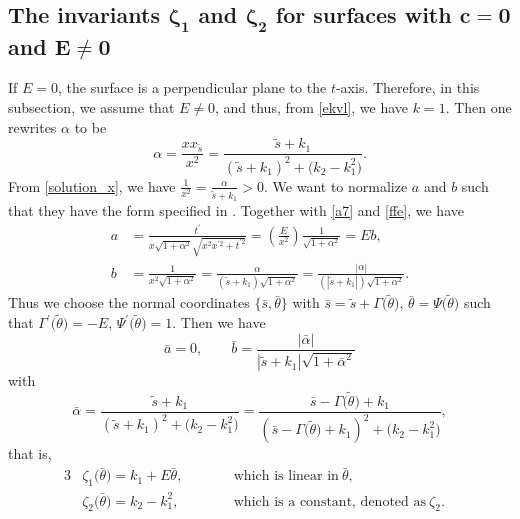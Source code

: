 \documentclass[10pt,a4paper]{amsart}
\numberwithin{equation}{section}
\begin{document}
\subsection[The invariants zeta\_1 and zeta\_2 for surfaces with c=0 and E neq 0]{The invariants $\boldsymbol{\zeta_{1}}$ and $\boldsymbol{\zeta_{2}}$ for surfaces with $\boldsymbol{c=0}$ and $\boldsymbol{E\neq 0}$}
 If $E=0$, the surface is a perpendicular plane to the $t$-axis. Therefore, in this subsection, we assume that $E\neq 0$, and thus, from \eqref{ekvl}, we have $k=1$.
Then one rewrites $\alpha$ to be
\begin{equation*}
\alpha=\frac{xx_{\tilde s}}{x^2}=\frac{\tilde s+k_1}{(\tilde s+k_1)^2+\bigl(k_2-k_{1}^{2}\bigr)}.
\end{equation*}
From \eqref{solution_x}, we have
$
\frac{1}{x^2}=\frac{\alpha}{\tilde{s}+k_1}>0$.
We want to normalize $a$ and $b$ such that they have the form specified in \cite[Theorem~1.3]{ChiuH/LiuH:2022}.
Together with \eqref{a7} and \eqref{ffe}, we have
\begin{align*}
a&=\frac{t^{\prime }}{x\sqrt{1+\alpha^2}\sqrt{x^{2}x^{\prime 2}+t^{\prime 2}}}
=\left(\frac{E}{x^{2}}\right)\frac{1}{\sqrt{1+\alpha^{2}}}=Eb, \\
b&=\frac{1}{x^2\sqrt{1+\alpha^2}}=\frac{\alpha}{(\tilde{s}+k_1)\sqrt{1+\alpha^2}}=\frac{|\alpha|}{(|\tilde{s}+k_1|)\sqrt{1+\alpha^2}}.
\end{align*}
Thus we choose the normal coordinates $\big\{ \bar{s},\bar{\theta}\big\}$ with
$
\bar{s}=\tilde{s}+\Gamma{\bigl(\tilde{\theta}\bigr)}$, $ \bar{\theta}=\Psi{\bigl(\tilde{\theta}\bigr)}
$
such that
$
\Gamma^{\prime }{\bigl(\tilde{\theta}\bigr)}=-E$, $ \Psi^{\prime }{\bigl(\tilde{\theta}\bigr)}=1$.
Then we have
\begin{equation*}
\bar{a}=0,\qquad \bar{b}=\frac{|\bar \alpha|}{|\tilde{s}+k_1|\sqrt{1+\bar
\alpha^2}}
\end{equation*}
with
\[
\bar \alpha=\frac{\tilde s+k_1}{(\tilde s+k_1)^2+\bigl(k_2-k_{1}^{2}\bigr)}=\frac{\bar{s}-\Gamma{\bigl(
\tilde{\theta}\bigr)}+k_1}{(\bar{s}-\Gamma{\bigl(\tilde{\theta}\bigr)}+k_1)^2+\bigl(k_2-k_{1}^{2}\bigr)},
\]
that is,
\begin{alignat*}{3}%
&\zeta_{1}\bigl(\bar \theta\bigr)=k_1+E\bar\theta,\qquad && \textrm{which is linear in} \ \bar{\theta},&\\
&\zeta_{2}\bigl(\bar \theta\bigr)=k_2-k_{1}^{2},\qquad && \textrm{which is a constant, denoted as} \ \zeta_{2}.&
\end{alignat*}
\end{document}
